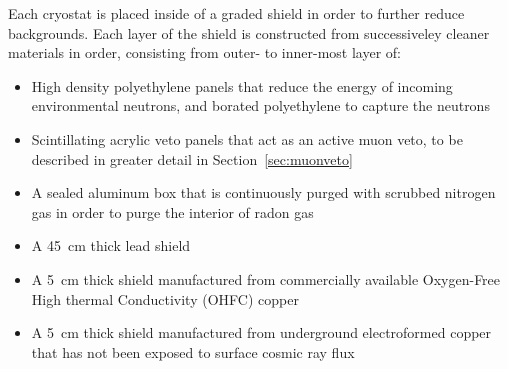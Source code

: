 \documentclass[/main.tex]{subfiles}
\begin{document}
Each cryostat is placed inside of a graded shield in order to further reduce backgrounds.
Each layer of the shield is constructed from successiveley cleaner materials in order, consisting from outer- to inner-most layer of:
\begin{itemize}
\item High density polyethylene panels that reduce the energy of incoming environmental neutrons, and borated polyethylene to capture the neutrons
\item Scintillating acrylic veto panels that act as an active muon veto, to be described in greater detail in Section~\ref{sec:muonveto}
\item A sealed aluminum box that is continuously purged with scrubbed nitrogen gas in order to purge the interior of radon gas
\item A 45~cm thick lead shield
\item A 5~cm thick shield manufactured from commercially available Oxygen-Free High thermal Conductivity (OHFC) copper
\item A 5~cm thick shield manufactured from underground electroformed copper that has not been exposed to surface cosmic ray flux
\end{itemize}
\end{document}
